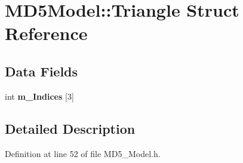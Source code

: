 \hypertarget{struct_m_d5_model_1_1_triangle}{}\section{M\+D5\+Model\+:\+:Triangle Struct Reference}
\label{struct_m_d5_model_1_1_triangle}
\subsection*{Data Fields}
\begin{DoxyCompactItemize}
\item 
int {\bfseries m\+\_\+\+Indices} \mbox{[}3\mbox{]}\hypertarget{struct_m_d5_model_1_1_triangle_a4be3f838c0ce71d92ca649977cb24b81}{}\label{struct_m_d5_model_1_1_triangle_a4be3f838c0ce71d92ca649977cb24b81}

\end{DoxyCompactItemize}


\subsection{Detailed Description}


Definition at line 52 of file M\+D5\+\_\+\+Model.\+h.


